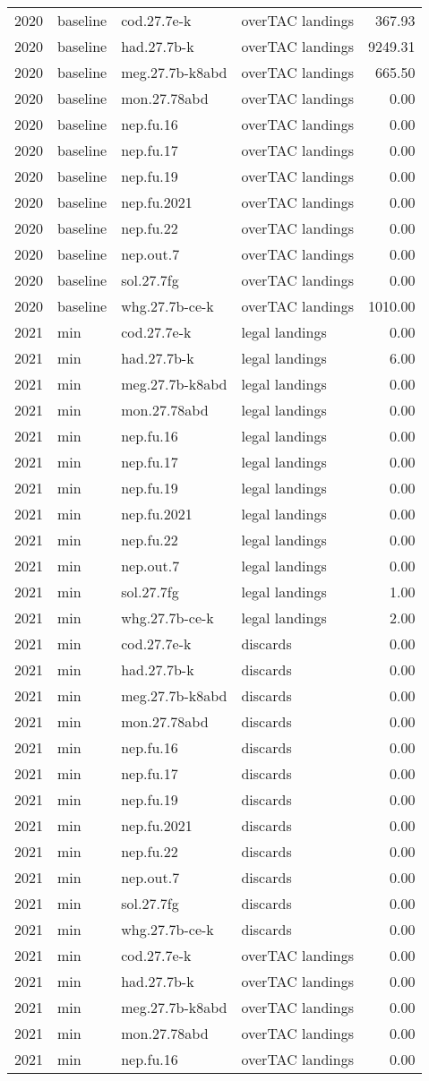 \documentclass[
]{article}
\begin{document}
\begin{longtable}[]{@{}llllr@{}}
2020 & baseline & cod.27.7e-k & overTAC landings & 367.93\tabularnewline
2020 & baseline & had.27.7b-k & overTAC landings &
9249.31\tabularnewline
2020 & baseline & meg.27.7b-k8abd & overTAC landings &
665.50\tabularnewline
2020 & baseline & mon.27.78abd & overTAC landings & 0.00\tabularnewline
2020 & baseline & nep.fu.16 & overTAC landings & 0.00\tabularnewline
2020 & baseline & nep.fu.17 & overTAC landings & 0.00\tabularnewline
2020 & baseline & nep.fu.19 & overTAC landings & 0.00\tabularnewline
2020 & baseline & nep.fu.2021 & overTAC landings & 0.00\tabularnewline
2020 & baseline & nep.fu.22 & overTAC landings & 0.00\tabularnewline
2020 & baseline & nep.out.7 & overTAC landings & 0.00\tabularnewline
2020 & baseline & sol.27.7fg & overTAC landings & 0.00\tabularnewline
2020 & baseline & whg.27.7b-ce-k & overTAC landings &
1010.00\tabularnewline
2021 & min & cod.27.7e-k & legal landings & 0.00\tabularnewline
2021 & min & had.27.7b-k & legal landings & 6.00\tabularnewline
2021 & min & meg.27.7b-k8abd & legal landings & 0.00\tabularnewline
2021 & min & mon.27.78abd & legal landings & 0.00\tabularnewline
2021 & min & nep.fu.16 & legal landings & 0.00\tabularnewline
2021 & min & nep.fu.17 & legal landings & 0.00\tabularnewline
2021 & min & nep.fu.19 & legal landings & 0.00\tabularnewline
2021 & min & nep.fu.2021 & legal landings & 0.00\tabularnewline
2021 & min & nep.fu.22 & legal landings & 0.00\tabularnewline
2021 & min & nep.out.7 & legal landings & 0.00\tabularnewline
2021 & min & sol.27.7fg & legal landings & 1.00\tabularnewline
2021 & min & whg.27.7b-ce-k & legal landings & 2.00\tabularnewline
2021 & min & cod.27.7e-k & discards & 0.00\tabularnewline
2021 & min & had.27.7b-k & discards & 0.00\tabularnewline
2021 & min & meg.27.7b-k8abd & discards & 0.00\tabularnewline
2021 & min & mon.27.78abd & discards & 0.00\tabularnewline
2021 & min & nep.fu.16 & discards & 0.00\tabularnewline
2021 & min & nep.fu.17 & discards & 0.00\tabularnewline
2021 & min & nep.fu.19 & discards & 0.00\tabularnewline
2021 & min & nep.fu.2021 & discards & 0.00\tabularnewline
2021 & min & nep.fu.22 & discards & 0.00\tabularnewline
2021 & min & nep.out.7 & discards & 0.00\tabularnewline
2021 & min & sol.27.7fg & discards & 0.00\tabularnewline
2021 & min & whg.27.7b-ce-k & discards & 0.00\tabularnewline
2021 & min & cod.27.7e-k & overTAC landings & 0.00\tabularnewline
2021 & min & had.27.7b-k & overTAC landings & 0.00\tabularnewline
2021 & min & meg.27.7b-k8abd & overTAC landings & 0.00\tabularnewline
2021 & min & mon.27.78abd & overTAC landings & 0.00\tabularnewline
2021 & min & nep.fu.16 & overTAC landings & 0.00\tabularnewline

\end{longtable}
\end{document}
